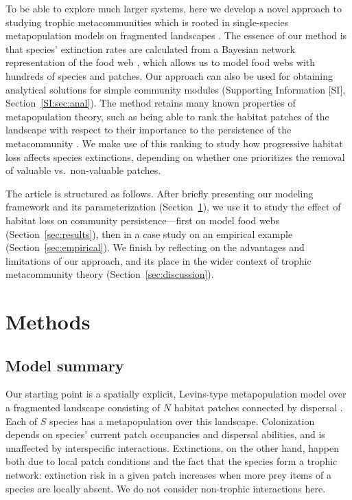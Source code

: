 \documentclass[11pt]{article}
\newcommand{\SI}{SI}
\begin{document}
To be able to explore much larger systems, here we develop a novel approach to studying trophic metacommunities which is rooted in single-species metapopulation models on fragmented landscapes \citep{HanskiOvaskainen2000, OvaskainenHanski2001, HanskiOvaskainen2003, Grillietal2015}. The essence of our method is that species' extinction rates are calculated from a Bayesian network representation of the food web \citep{Eklofetal2013MEE}, which allows us to model food webs with hundreds of species and patches. Our approach can also be used for obtaining analytical solutions for simple community modules (Supporting Information [\SI], Section~\ref{SI:sec:anal}). The method retains many known properties of metapopulation theory, such as being able to rank the habitat patches of the landscape with respect to their importance to the persistence of the metacommunity \citep{OvaskainenHanski2001}. We make use of this ranking to study how progressive habitat loss affects species extinctions, depending on whether one prioritizes the removal of valuable vs.\ non-valuable patches.

The article is structured as follows. After briefly presenting our modeling framework and its parameterization (Section~\ref{sec:methods}), we use it to study the effect of habitat loss on community persistence---first on model food webs (Section~\ref{sec:results}), then in a case study on an empirical example (Section~\ref{sec:empirical}). We finish by reflecting on the advantages and limitations of our approach, and its place in the wider context of trophic metacommunity theory (Section~\ref{sec:discussion}).


\section{Methods} \label{sec:methods}

\subsection{Model summary} \label{sec:model}

Our starting point is a spatially explicit, Levins-type metapopulation model over a fragmented landscape consisting of $N$ habitat patches connected by dispersal \citep{HanskiOvaskainen2000, HanskiOvaskainen2003, OvaskainenHanski2001, Grillietal2015}. Each of $S$ species has a metapopulation over this landscape. Colonization depends on species' current patch occupancies and dispersal abilities, and is unaffected by interspecific interactions. Extinctions, on the other hand, happen both due to local patch conditions and the fact that the species form a trophic network: extinction risk in a given patch increases when more prey items of a species are locally absent. We do not consider non-trophic interactions here.
\end{document}
